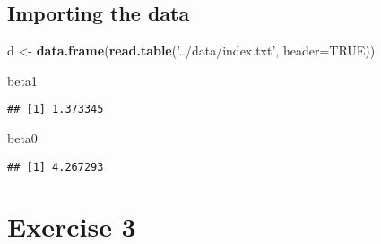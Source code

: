 \documentclass[]{article}
\newenvironment{Shaded}{\begin{snugshade}}{\end{snugshade}}
\newcommand{\DataTypeTok}[1]{\textcolor[rgb]{0.13,0.29,0.53}{#1}}
\newcommand{\KeywordTok}[1]{\textcolor[rgb]{0.13,0.29,0.53}{\textbf{#1}}}
\newcommand{\NormalTok}[1]{#1}
\newcommand{\OperatorTok}[1]{\textcolor[rgb]{0.81,0.36,0.00}{\textbf{#1}}}
\newcommand{\OtherTok}[1]{\textcolor[rgb]{0.56,0.35,0.01}{#1}}
\newcommand{\StringTok}[1]{\textcolor[rgb]{0.31,0.60,0.02}{#1}}
\begin{document}
\hypertarget{importing-the-data}{%
\subsection{Importing the data}\label{importing-the-data}}

\begin{Shaded}
\begin{Highlighting}[]
\NormalTok{d <-}\StringTok{ }\KeywordTok{data.frame}\NormalTok{(}\KeywordTok{read.table}\NormalTok{(}\StringTok{'../data/index.txt'}\NormalTok{, }\DataTypeTok{header=}\OtherTok{TRUE}\NormalTok{))}
\end{Highlighting}
\end{Shaded}

\begin{Shaded}
\end{Shaded}

\begin{Shaded}
\begin{Highlighting}[]
\NormalTok{beta1}
\end{Highlighting}
\end{Shaded}

\begin{verbatim}
## [1] 1.373345
\end{verbatim}

\begin{Shaded}
\begin{Highlighting}[]
\NormalTok{beta0}
\end{Highlighting}
\end{Shaded}

\begin{verbatim}
## [1] 4.267293
\end{verbatim}

\newpage

\hypertarget{exercise-3}{%
\section{Exercise 3}\label{exercise-3}}
\end{document}
